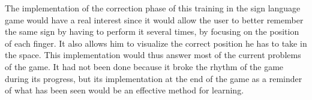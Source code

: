 The implementation of the correction phase of this training in the sign language game would have a real interest since it would allow the user to better remember the same sign by having to perform it several times, by focusing on the position of each finger. It also allows him to visualize the correct position he has to take in the space. 
This implementation would thus answer most of the current problems of the game. It had not been done because it broke the rhythm of the game during its progress, but its implementation at the end of the game as a reminder of what has been seen would be an effective method for learning.


